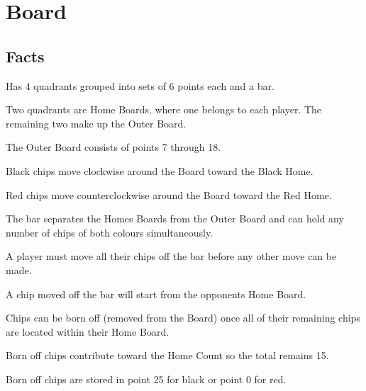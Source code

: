 \section{Board}

\subsection{Facts}

\begin{dashed}
    \item Has 4 quadrants grouped into sets of 6 points each and a bar.
    \item Two quadrants are Home Boards, where one belongs to each player. The remaining two make up         the Outer Board.
    \item The Outer Board consists of points 7 through 18.
    \item Black chips move clockwise around the Board toward the Black Home.
    \item Red chips move counterclockwise around the Board toward the Red Home.
    \item The bar separates the Homes Boards from the Outer Board and can hold any number of chips of        both colours simultaneously.
    \item A player must move all their chips off the bar before any other move can be made.
    \item A chip moved off the bar will start from the opponents Home Board.
    \item Chips can be born off (removed from the Board) once all of their remaining chips are located       within their Home Board.
    \item Born off chips contribute toward the Home Count so the total remains 15.
    \item Born off chips are stored in point 25 for black or point 0 for red.
\end{dashed}


